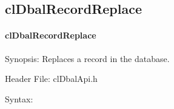 \begin{flushleft}
\newpage
\subsection{clDbalRecordReplace}
\hypertarget{pagedbal106}{}\paragraph{cl\-Dbal\-Record\-Replace}\label{pagedbal106}
\begin{Desc}
\item[Synopsis:]Replaces a record in the database.\end{Desc}
\begin{Desc}
\item[Header File:]clDbalApi.h\end{Desc}
\begin{Desc}
\item[Syntax:]


\end{Desc}
\end{flushleft}
